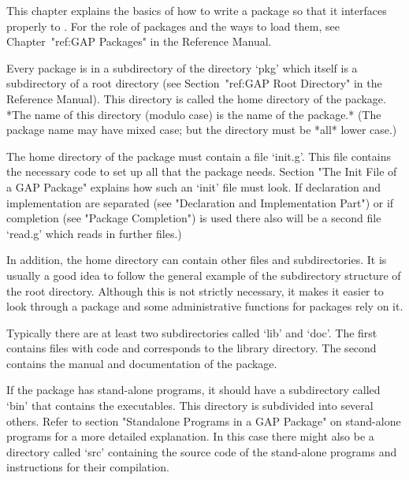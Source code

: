 

This chapter explains the basics of how to write a {\GAP} package so that it
interfaces properly to {\GAP}.
For the role of {\GAP} packages and the ways to load them,
see Chapter~"ref:GAP Packages" in the Reference Manual.


Every {\GAP} package is in a subdirectory of the directory `pkg' which
itself is a subdirectory of a {\GAP} root directory
(see Section~"ref:GAP Root Directory" in the Reference Manual).
This directory is called the home directory of the {\GAP} package.
*The name of this directory (modulo case) is the name of the package.*
(The package name may have mixed case; but the directory must be *all* lower
case.)

The home directory of the {\GAP} package must contain a file
`init.g'. This file contains the necessary {\GAP} code to set up all
that the package needs. Section "The Init File of a GAP
Package" explains how such an `init' file must look. If declaration
and implementation are separated (see "Declaration and Implementation
Part") or if completion (see "Package Completion") is used
there also will be a second file `read.g' which reads in
further files.)

In addition, the home directory can contain other files and
subdirectories. It is usually a good idea to follow the general
example of the subdirectory structure of the {\GAP} root directory.
Although this is not strictly necessary, it makes it easier to look
through a {\GAP} package and some administrative functions for {\GAP}
packages rely on it.

Typically there are at least two subdirectories called `lib' and
`doc'. The first contains files with {\GAP} code and corresponds to
the {\GAP} library directory. The second contains the manual and
documentation of the package.

If the {\GAP} package has stand-alone programs, it should have a
subdirectory called `bin' that contains the executables. This
directory is subdivided into several others. Refer to section
"Standalone Programs in a GAP Package" on stand-alone programs for a
more detailed explanation. In this case there might also be a
directory called `src' containing the source code of the stand-alone
programs and instructions for their compilation.

